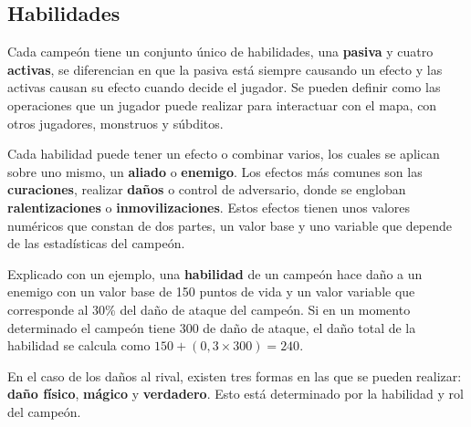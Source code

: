 \subsection{Habilidades}
\label{habilidades}
Cada campeón tiene un conjunto único de habilidades, una \textbf{pasiva} y cuatro \textbf{activas}, se diferencian en que la pasiva está siempre causando un efecto y las activas causan su efecto cuando decide el jugador. Se pueden definir como las operaciones que un jugador puede realizar para interactuar con el mapa, con otros jugadores, monstruos y súbditos.

Cada habilidad puede tener un efecto o combinar varios, los cuales se aplican sobre uno mismo, un \textbf{aliado} o \textbf{enemigo}. Los efectos más comunes son las \textbf{curaciones}, realizar \textbf{daños} o control de adversario, donde se engloban \textbf{ralentizaciones} o \textbf{inmovilizaciones}. Estos efectos tienen unos valores numéricos que constan de dos partes, un valor base y uno variable que depende de las estadísticas del campeón.

Explicado con un ejemplo, una \textbf{habilidad} de un campeón hace daño a un enemigo con un valor base de 150 puntos de vida y un valor variable que corresponde al 30\% del daño de ataque del campeón. Si en un momento determinado el campeón tiene 300 de daño de ataque, el daño total de la habilidad se calcula como $150 + (0,3 \times 300) = 240$.

En el caso de los daños al rival, existen tres formas en las que se pueden realizar: \textbf{daño físico}, \textbf{mágico} y \textbf{verdadero}. Esto está determinado por la habilidad y rol del campeón.

